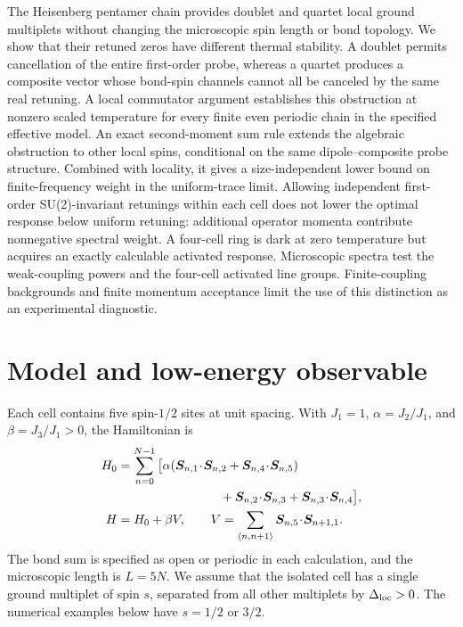 The Heisenberg pentamer chain provides doublet and quartet local ground
multiplets without changing the microscopic spin length or bond topology.
We show that their retuned zeros have different thermal stability. A
doublet permits cancellation of the entire first-order probe, whereas a
quartet produces a composite vector whose bond-spin channels cannot all be
canceled by the same real retuning. A local commutator argument establishes
this obstruction at nonzero scaled temperature for every finite even
periodic chain in the specified effective model. An exact second-moment
sum rule extends the algebraic obstruction to other local spins,
conditional on the same dipole--composite probe structure. Combined with
locality, it gives a size-independent lower bound on finite-frequency
weight in the uniform-trace limit. Allowing independent first-order
SU(2)-invariant retunings within each cell does not lower the optimal
response below uniform retuning: additional operator momenta contribute
nonnegative spectral weight. A four-cell ring is dark
at zero temperature but acquires an exactly calculable activated response.
Microscopic spectra test the weak-coupling powers and the four-cell activated
line groups. Finite-coupling backgrounds and finite momentum
acceptance limit the use of this distinction
as an experimental diagnostic.

\section{Model and low-energy observable}

Each cell contains five spin-$1/2$ sites at unit spacing. With $J_1=1$,
$\alpha=J_2/J_1$, and $\beta=J_3/J_1>0$, the Hamiltonian is
\begin{align}
 H_0&=\sum_{n=0}^{N-1}\big[
 \alpha(\bm S_{n,1}\!\cdot\!\bm S_{n,2}
       +\bm S_{n,4}\!\cdot\!\bm S_{n,5})\notag\\
 &\hspace{29mm}+\bm S_{n,2}\!\cdot\!\bm S_{n,3}
       +\bm S_{n,3}\!\cdot\!\bm S_{n,4}\big],\\
 H&=H_0+\beta V,\qquad
 V=\sum_{\langle n,n+1\rangle}\bm S_{n,5}\!\cdot\!\bm S_{n+1,1}.
 \label{eq:rank-ham}
\end{align}
The bond sum is specified as open or periodic in each calculation, and the
microscopic length is $L=5N$. We assume that the isolated cell has a single
ground multiplet of spin $s$, separated from all other multiplets by
$\Delta_{\mathrm{loc}}>0$. The numerical examples below have $s=1/2$ or $3/2$.

